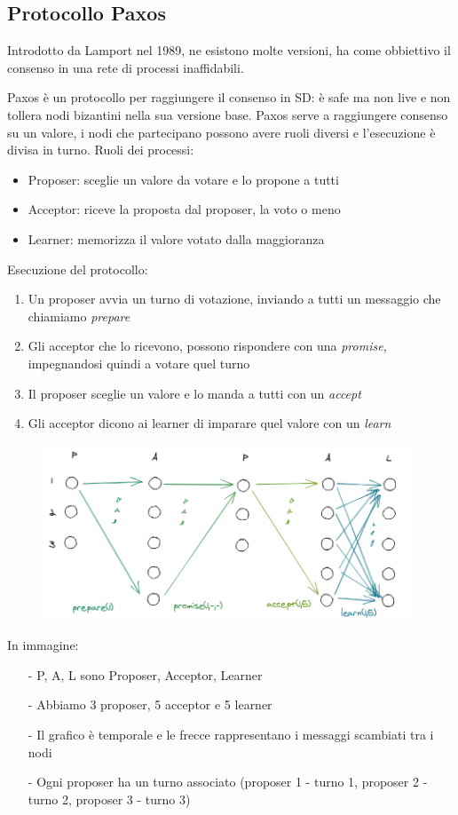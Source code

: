 \documentclass[12pt,italian]{report}
\begin{document}
\subsection{Protocollo Paxos}
Introdotto da Lamport nel 1989, ne esistono molte versioni, ha come obbiettivo il consenso in una rete di processi inaffidabili. 

Paxos è un protocollo per raggiungere il consenso in SD: è safe ma non live e non tollera nodi bizantini nella sua versione base. Paxos serve a raggiungere consenso su un valore, i nodi che partecipano possono avere ruoli diversi e l'esecuzione è divisa in turno. 
\bigbreak
\noindent Ruoli dei processi:
\begin{itemize}
    \item Proposer: sceglie un valore da votare e lo propone a tutti
    \item Acceptor: riceve la proposta dal proposer, la voto o meno
    \item Learner: memorizza il valore votato dalla maggioranza
\end{itemize}
\noindent Esecuzione del protocollo:
\begin{enumerate}
    \item Un proposer avvia un turno di votazione, inviando a tutti un messaggio che chiamiamo \textit{prepare}
    \item Gli acceptor che lo ricevono, possono rispondere con una \textit{promise}, impegnandosi quindi a votare quel turno
    \item Il proposer sceglie un valore e lo manda a tutti con un \textit{accept}
    \item Gli acceptor dicono ai learner di imparare quel valore con un \textit{learn}
\end{enumerate}
\begin{figure}[h]
\centering
\includegraphics[width=110mm]{img/paxos.png}
\end{figure}
\bigbreak
\noindent In immagine:
\begin{itemize}
    \item [-] P, A, L sono Proposer, Acceptor, Learner
    \item [-] Abbiamo 3 proposer, 5 acceptor e 5 learner
    \item [-] Il grafico è temporale e le frecce rappresentano i messaggi scambiati tra i nodi
    \item [-] Ogni proposer ha un turno associato (proposer 1 - turno 1, proposer 2 - turno 2, proposer 3 - turno 3)
\end{itemize}
\end{document}
